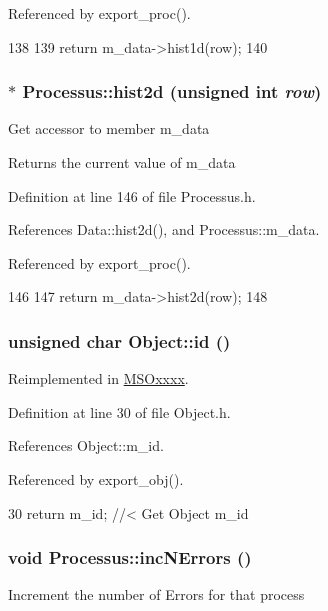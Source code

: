 Referenced by export\_\-proc().


\begin{DoxyCode}
138                                    {
139     return m_data->hist1d(row);
140   }
\end{DoxyCode}
\hypertarget{classProcessus_a73b5118cb5f2b5eaad33286183b86cfc}{
\subsubsection[{hist2d}]{$\ast$ Processus::hist2d (unsigned int {\em row})}}
\label{classProcessus_a73b5118cb5f2b5eaad33286183b86cfc}
Get accessor to member m\_\-data \begin{DoxyReturn}{Returns}
the current value of m\_\-data 
\end{DoxyReturn}


Definition at line 146 of file Processus.h.

References Data::hist2d(), and Processus::m\_\-data.

Referenced by export\_\-proc().


\begin{DoxyCode}
146                                    {
147     return m_data->hist2d(row);
148   }
\end{DoxyCode}
\hypertarget{classObject_af99145335cc61ff6e2798ea17db009d2}{
\subsubsection[{id}]{\setlength{\rightskip}{0pt plus 5cm}unsigned char Object::id ()}}
\label{classObject_af99145335cc61ff6e2798ea17db009d2}


Reimplemented in \hyperlink{classMSOxxxx_a0f14b23d31d8e7647184e99a89600cc3}{MSOxxxx}.

Definition at line 30 of file Object.h.

References Object::m\_\-id.

Referenced by export\_\-obj().


\begin{DoxyCode}
30 { return m_id;         } //< Get Object m_id 
\end{DoxyCode}
\hypertarget{classProcessus_abe603d0636f76db6aa6c5c60cf34c591}{
\subsubsection[{incNErrors}]{\setlength{\rightskip}{0pt plus 5cm}void Processus::incNErrors ()}}
\label{classProcessus_abe603d0636f76db6aa6c5c60cf34c591}
Increment the number of Errors for that process 

